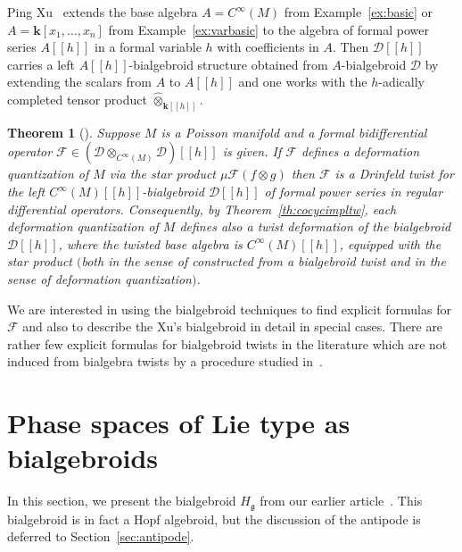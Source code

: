 \documentclass[10pt,a4paper]{amsart}
\def\genfd{\mathbf{k}}
\def\gg{\mathfrak{g}}
\newtheorem{Theorem}{Theorem}[section]
\numberwithin{equation}{section}
\begin{document}
\begin{Example}\label{ex:defquant} Ping Xu~\cite{xu} extends the base algebra $A = C^\infty(M)$
from Example~\ref{ex:basic} or $A = \genfd[x_1,\dots,x_n]$ from Example~\ref{ex:varbasic} to the algebra of formal power series $A[[h]]$ in a formal variable $h$ with coefficients in $A$. Then $\mathcal{D}[[h]]$ carries a left $A[[h]]$-bialgebroid structure obtained from $A$-bialgebroid $\mathcal{D}$ by extending the scalars from $A$ to $A[[h]]$ and one works with the $h$-adically completed tensor product $\hat\otimes_{\genfd[[h]]}$.
\end{Example}

\begin{Theorem}[\cite{xu}]\label{thm:defqinterp}
Suppose $M$ is a Poisson manifold and a formal bidifferential operator $\mathcal{F} \in (\mathcal{D}\otimes_{C^\infty(M)}\mathcal{D})[[h]]$ is given. If $\mathcal{F}$ defines a deformation quantization of $M$ via the star product $\mu\mathcal{F}(f\otimes g)$ then $\mathcal{F}$ is a Drinfeld twist for the left $C^\infty(M)[[h]]$-bialgebroid $\mathcal{D}[[h]]$ of formal power series in regular differential operators. Consequently, by Theorem~{\rm \ref{th:cocycimpltw}}, each deformation quantization of $M$ defines also a twist deformation of the bialgebroid $\mathcal{D}[[h]]$, where the twisted base algebra is $C^\infty(M)[[h]]$, equipped with the star product $($both in the sense of constructed from a bialgebroid twist and in the sense of deformation quantization$)$.
\end{Theorem}
We are interested in using the bialgebroid techniques to find explicit formulas for $\mathcal{F}$ and also to describe the Xu's bialgebroid in detail in special cases. There are rather few explicit formulas for bialgebroid twists in the literature which are not induced from bialgebra twists
by a procedure studied in~\cite{borpacholtwistedoid}.

\section{Phase spaces of Lie type as bialgebroids}\label{s:repeathalg}

In this section, we present the bialgebroid $H_\gg$ from our earlier article~\cite{halg}. This bialgebroid is in fact a Hopf algebroid, but the discussion of the antipode is deferred to Section~\ref{sec:antipode}.
\end{document}
